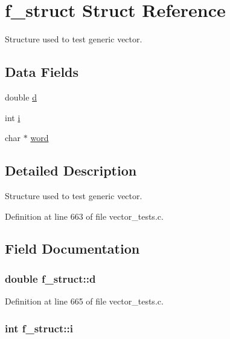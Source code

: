 \hypertarget{structf__struct}{\section{f\-\_\-struct \-Struct \-Reference}
\label{structf__struct}
}


\-Structure used to test generic vector.  


\subsection*{\-Data \-Fields}
\begin{DoxyCompactItemize}
\item 
double \hyperlink{structf__struct_aabfd173ef817f4c258a9e55aaa2ec9cf}{d}
\item 
int \hyperlink{structf__struct_a87df300d9aa87b7df7cba13e548c948f}{i}
\item 
char $\ast$ \hyperlink{structf__struct_aa8f65f08c5e6180da916f9001438eab5}{word}
\end{DoxyCompactItemize}


\subsection{\-Detailed \-Description}
\-Structure used to test generic vector. 



\-Definition at line 663 of file vector\-\_\-tests.\-c.



\subsection{\-Field \-Documentation}
\hypertarget{structf__struct_aabfd173ef817f4c258a9e55aaa2ec9cf}{
\subsubsection[{d}]{\setlength{\rightskip}{0pt plus 5cm}double {\bf f\-\_\-struct\-::d}}}\label{structf__struct_aabfd173ef817f4c258a9e55aaa2ec9cf}


\-Definition at line 665 of file vector\-\_\-tests.\-c.

\hypertarget{structf__struct_a87df300d9aa87b7df7cba13e548c948f}{
\subsubsection[{i}]{\setlength{\rightskip}{0pt plus 5cm}int {\bf f\-\_\-struct\-::i}}}\label{structf__struct_a87df300d9aa87b7df7cba13e548c948f}


